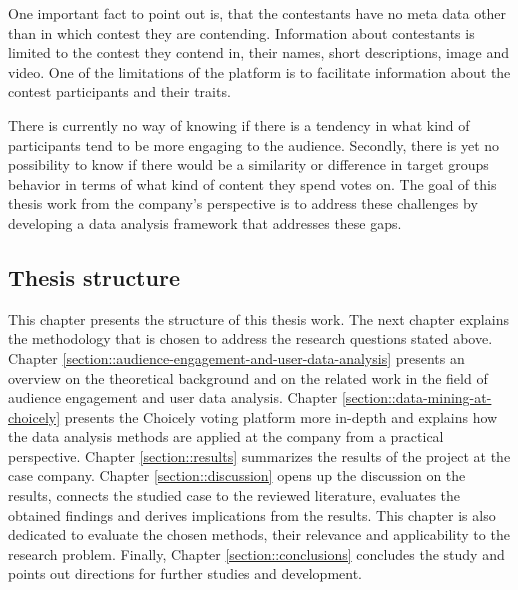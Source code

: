     One important fact to point out is, that the contestants have no meta data other than in which contest they are contending. Information about contestants is limited to the contest they contend in, their names, short descriptions, image and video. One of the limitations of the platform is to facilitate information about the contest participants and their traits. 
    
    There is currently no way of knowing if there is a tendency in what kind of participants tend to be more engaging to the audience. Secondly, there is yet no possibility to know if there would be a similarity or difference in target groups behavior in terms of what kind of content they spend votes on. The goal of this thesis work from the company's perspective is to address these challenges by developing a data analysis framework that addresses these gaps.

\subsection{Thesis structure}
    This chapter presents the structure of this thesis work. The next chapter explains the methodology that is chosen to address the research questions stated above. Chapter \ref{section::audience-engagement-and-user-data-analysis} presents an overview on the theoretical background and on the related work in the field of audience engagement and user data analysis. Chapter \ref{section::data-mining-at-choicely} presents the Choicely voting platform more in-depth and explains how the data analysis methods are applied at the company from a practical perspective. Chapter \ref{section::results} summarizes the results of the project at the case company. Chapter \ref{section::discussion} opens up the discussion on the results, connects the studied case to the reviewed literature, evaluates the obtained findings and derives implications from the results. This chapter is also dedicated to evaluate the chosen methods, their relevance and applicability to the research problem. Finally, Chapter \ref{section::conclusions} concludes the study and points out directions for further studies and development. 